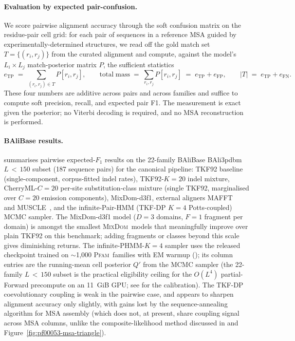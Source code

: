 \documentclass[11pt]{article}
\theoremstyle{definition}
\theoremstyle{remark}
\newcommand{\MixDom}{\textsc{MixDom}}
\newcommand{\Pfam}{\textsc{Pfam}}
\begin{document}
\paragraph{Evaluation by expected pair-confusion.}
We score pairwise alignment accuracy through the soft confusion
matrix on the residue-pair cell grid: for each pair of sequences in
a reference MSA guided by experimentally-determined structures, we read off the gold match set
$T = \{(r_i, r_j)\}$ from the curated alignment and compute, against
the model's $L_i \times L_j$ match-posterior matrix $P$, the
sufficient statistics
\begin{equation}
e_{\mathrm{TP}} \;=\; \!\!\!\sum_{(r_i, r_j) \in T}\!\!\! P[r_i, r_j],
\qquad
\mathrm{total\;mass} \;=\; \!\!\sum_{r_i, r_j}\!\! P[r_i, r_j]
  \;=\; e_{\mathrm{TP}} + e_{\mathrm{FP}},
\qquad
|T| \;=\; e_{\mathrm{TP}} + e_{\mathrm{FN}}.
\end{equation}
These four numbers are additive across pairs and across families and
suffice to compute soft precision, recall, and expected pair F1.
The measurement is
exact given the posterior; no Viterbi decoding is required, and no
MSA reconstruction is performed.

\paragraph{BAliBase results.}
 summarises pairwise expected-$F_1$ results
on the 22-family BAliBase BAli3pdbm $L\,{<}\,150$ subset (187
sequence pairs) for the canonical pipeline:
TKF92 baseline (single-component, corpus-fitted indel
rates), TKF92-$K{=}20$ indel mixture, CherryML-$C{=}20$ per-site
substitution-class mixture (single TKF92, marginalised over $C{=}20$
emission components), MixDom-d3f1,
external aligners MAFFT~\citep{Katoh2013} and MUSCLE~\citep{Edgar2004}, and the infinite-Pair-HMM (TKF-DP
$K{=}4$ Potts-coupled) MCMC sampler.  The MixDom-d3f1 model
($D = 3$ domains, $F = 1$ fragment per domain) is amongst the smallest
\MixDom\ models that meaningfully improve over plain TKF92 on this
benchmark; adding fragments or classes beyond this scale gives
diminishing returns.  The
infinite-PHMM-$K{=}4$ sampler uses the released checkpoint trained on
$\sim$1{,}000 \Pfam\ families with EM warmup
(); its column entries are the
running-mean cell posterior $Q'$ from the MCMC sampler (the
22-family $L\,{<}\,150$ subset is the practical eligibility ceiling
for the $O(L^4)$ partial-Forward precompute on an 11~GiB GPU; see
 for the calibration).
The TKF-DP coevolutionary coupling is weak in the pairwise case, and appears to sharpen
alignment accuracy only slightly, with gains lost by the sequence-annealing algorithm for MSA assembly
(which does not, at present, share coupling signal across MSA columns, unlike the composite-likelihood method
discussed in  and Figure~\ref{fig:pf00053-msa-triangle}).
\end{document}
